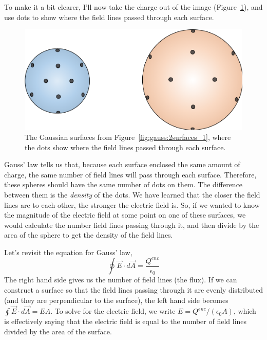 \begin{framed}
To make it a bit clearer, I'll now take the charge out of the image (Figure~\ref{fig:gauss:2surfaces_2}), and use dots to show where the field lines passed through each surface.

\begin{figure}[!htbp]
\centering
\includegraphics[width=0.5\linewidth]{files/2surfaces_2-7b83365589a0dc3bba79cef83eaf9f3f.png}
\caption[]{The Gaussian surfaces from Figure~\ref{fig:gauss:2surfaces_1}, where the dots show where the field lines passed through each surface.}
\label{fig:gauss:2surfaces_2}
\end{figure}

Gauss' law tells us that, because each surface enclosed the same amount of charge, the same number of field lines will pass through each surface. Therefore, these spheres should have the same number of dots on them. The difference between them is the \textit{density} of the dots. We have learned that the closer the field lines are to each other, the stronger the electric field is. So, if we wanted to know the magnitude of the electric field at some point on one of these surfaces, we would calculate the number field lines passing through it, and then divide by the area of the sphere to get the density of the field lines.

Let's revisit the equation for Gauss' law,
\begin{equation}
\oint \vec E\cdot d\vec A=\frac{Q^{enc}}{\epsilon_0}
\end{equation}
The right hand side gives us the number of field lines (the flux). If we can construct a surface so that the field lines passing through it are evenly distributed (and they are perpendicular to the surface), the left hand side becomes $\oint \vec E\cdot d\vec A= EA$. To solve for the electric field, we write $E=Q^{enc}/(\epsilon_0A)$, which is effectively saying that the electric field is equal to the number of field lines divided by the area of the surface.
\end{framed}

